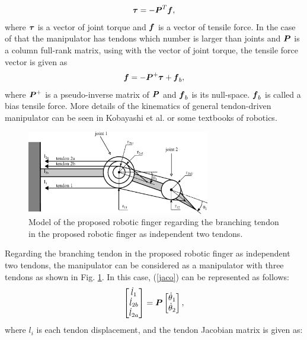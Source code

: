 \documentclass{llncs}
\def\vect#1{\mbox{\boldmath$#1$}}
\begin{document}
\begin{align}
	\vect{\tau}=-\vect{P}^{T}\vect{f},
	\label{force_relation}
\end{align}
where $\vect{\tau}$ is a vector of joint torque and $\vect{f}$ is a vector of tensile force.
In the case of that the manipulator has tendons which number is larger than joints and $\vect{P}$ is a column full-rank matrix, using with the vector of joint torque, the tensile force vector is given as
\begin{align}
	\vect{f} = -\vect{P}^{+}\vect{\tau}+\vect{f}_{b},
	\label{tensile_force}
\end{align}
where $\vect{P}^{+}$ is a pseudo-inverse matrix of $\vect{P}$ and $\vect{f}_{b}$ is its null-space.
$\vect{f}_{b}$ is called a bias tensile force.
More details of the kinematics of general tendon-driven manipulator can be seen in Kobayashi et al.\cite{kobayashi1998} or some textbooks of robotics\cite{murrayi1994,tsai1999}.
\begin{figure}[t]
	\centering
	\includegraphics[width=80mm]{fig/slacked.eps}
	\caption{Model of the proposed robotic finger regarding the branching tendon in the proposed robotic finger as independent two tendons.}
	\label{nonbranching_model}
\end{figure}
Regarding the branching tendon in the proposed robotic finger as independent two tendons, the manipulator can be considered as a manipulator with three tendons as shown in Fig. \ref{nonbranching_model}.
In this case, (\ref{jaco}) can be represented as follows:
\begin{align}
	\begin{bmatrix}
		\dot{l}_{1}\\
		\dot{l}_{2b}\\
		\dot{l}_{2a}
	\end{bmatrix}
					=\vect{P}
					\begin{bmatrix}
					\dot{\theta}_{1}\\
					\dot{\theta}_{2}
					\end{bmatrix},
\label{jaco_relation}
\end{align}
where $l_{i}$ is each tendon displacement, and the tendon Jacobian matrix is given as:
\end{document}

